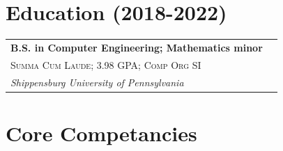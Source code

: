 \documentclass[
	10pt, %
]{FreemanCV}
\begin{document}
\medskip %





\begin{paracol}{2}

\section{Education (2018-2022)} 


\begin{supertabular}{l l} %

	
	\textbf{B.S. in Computer Engineering; Mathematics minor}\\ %
	\small\textsc{Summa Cum Laude; 3.98 GPA; Comp Org SI}\\ %
	\textit{Shippensburg University of Pennsylvania}\\ %
	

\end{supertabular}

\switchcolumn

\section{Core Competancies}


\end{paracol}
\end{document}
